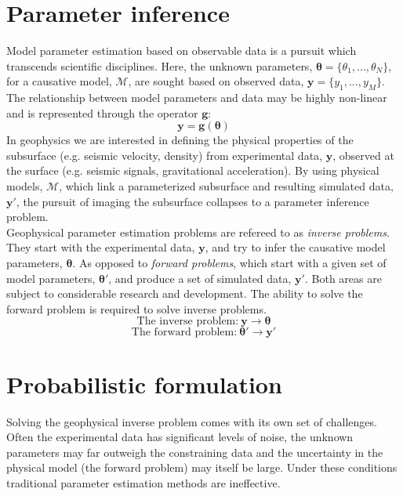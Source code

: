 \section{Parameter inference}

Model parameter estimation based on observable data is a pursuit which transcends scientific disciplines. Here, the unknown parameters, $\bm{\theta} = \{\theta_1,...,\theta_N\}$, for a causative model, $\mathcal{M}$, are sought based on observed data, $\bm{y} = \{y_1,...,y_M\}$. The relationship between model parameters and data may be highly non-linear and is represented through the operator $\bm{g}$:
\begin{equation}
\bm{y} = \bm{g}(\bm{\theta})
\label{basic_data_parameters}
\end{equation}	
In geophysics we are interested in defining the physical properties  of the subsurface (e.g. seismic velocity, density) from experimental data, $\bm{y}$, observed at the surface (e.g. seismic signals, gravitational acceleration). By using physical models, $\mathcal{M}$, which link a parameterized subsurface and resulting simulated data, $\bm{y'}$, the pursuit of imaging the subsurface collapses to a parameter inference problem.\\

Geophysical parameter estimation problems are refereed to as \textit{inverse problems}. They start with the experimental data, $\bm{y}$, and try to infer the causative model parameters, $\bm{\theta}$. As opposed to \textit{forward problems}, which start with a given set of model parameters, $\bm{\theta'}$, and produce a set of simulated data, $\bm{y'}$. Both areas are subject to considerable research and development. The ability to solve the forward problem is required to solve inverse problems.\\
\begin{equation}
\text{The inverse problem:}\ \bm{y} \rightarrow \bm{\theta}
\label{inverse_problem}
\end{equation}
\begin{equation}
\text{The forward problem:}\ \bm{\theta'} \rightarrow \bm{y'}
\label{forward_problem}
\end{equation}

\section{Probabilistic formulation}

Solving the geophysical inverse problem comes with its own set of challenges. Often the experimental data has significant levels of noise, the unknown parameters may far outweigh the constraining data and the uncertainty in the physical model (the forward problem) may itself be large. Under these conditions traditional parameter estimation methods are ineffective.\\

